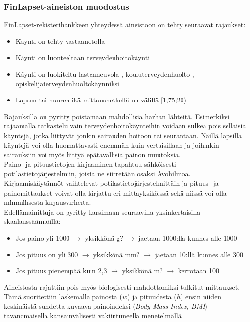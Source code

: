 \documentclass[finnish]{docopts}
\begin{document}
\subsubsection{FinLapset-aineiston muodostus}
\label{ssb:finlapsetdatamuod}

FinLapset-rekisterihankkeen yhteydessä aineistoon on tehty seuraavat rajaukset:

\begin{itemize}
    \item Käynti on tehty vastaanotolla
    \item Käynti on luonteeltaan terveydenhoitokäynti
    \item Käynti on luokiteltu lastenneuvola-, kouluterveydenhuolto-, opiskelijaterveydenhuoltokäynniksi
    \item Lapsen tai nuoren ikä mittaushetkellä on välillä [1,75;20)
\end{itemize}

Rajauksilla on pyritty poistamaan mahdollisia harhan lähteitä. Esimerkiksi rajaamalla tarkastelu vain terveydenhoitokäynteihin voidaan sulkea pois sellaisia käyntejä, jotka liittyvät jonkin sairauden hoitoon tai seurantaan. Näillä lapsilla käyntejä voi olla huomattavasti enemmän kuin vertaisillaan ja joihinkin sairauksiin voi myös liittyä epätavallisia painon muutoksia. \\

Paino- ja pituustietojen kirjaaminen tapahtuu sähköisesti potilastietojärjestelmiin, joista ne siirretään osaksi Avohilmoa. Kirjaamiskäytännöt vaihtelevat potilastietojärjestelmittäin ja pituus- ja painomittaukset voivat olla kirjattu eri mittayksiköissä sekä niissä voi olla inhimillisestä kirjausvirheitä.\\

Edellämainittuja on pyritty karsimaan seuraavilla yksinkertaisilla skaalaussäännöillä:

\begin{itemize}
    \item Jos paino yli 1000 $\longrightarrow$ yksikkönä g?  $\longrightarrow$ jaetaan 1000:lla kunnes alle 1000
    \item Jos pituus on yli 300 $\longrightarrow$ yksikkönä mm? $\longrightarrow$ jaetaan 10:llä kunnes alle 300
    \item Jos pituus pienempää kuin 2,3 $\longrightarrow$ yksikkönä m? $\longrightarrow$ kerrotaan 100
\end{itemize}

Aineistosta rajattiin pois myös biologisesti mahdottomiksi tulkitut mittaukset. Tämä suoritettiin laskemalla painosta ($w$) ja pituudesta ($h$) ensin niiden keskinäistä suhdetta kuvaava painoindeksi (\textit{Body Mass Index, BMI}) tavanomaisella kansainvälisesti vakiintuneella menetelmällä
\end{document}
